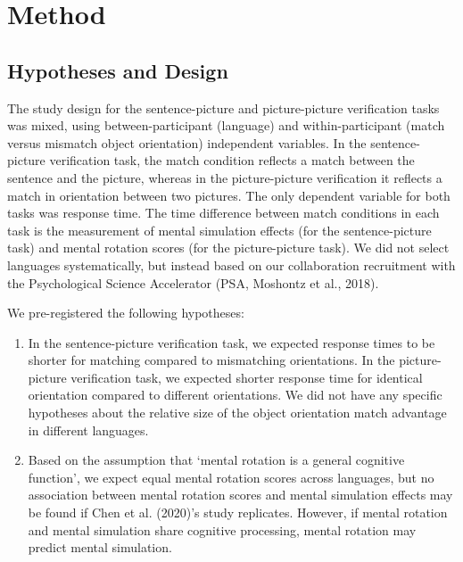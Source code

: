 \documentclass[
  man,mask,floatsintext]{apa7}
\begin{document}
\hypertarget{method}{%
\section{Method}\label{method}}

\hypertarget{hypotheses-and-design}{%
\subsection{Hypotheses and Design}\label{hypotheses-and-design}}

The study design for the sentence-picture and picture-picture
verification tasks was mixed, using between-participant (language) and
within-participant (match versus mismatch object orientation)
independent variables. In the sentence-picture verification task, the
match condition reflects a match between the sentence and the picture,
whereas in the picture-picture verification it reflects a match in
orientation between two pictures. The only dependent variable for both
tasks was response time. The time difference between match conditions in
each task is the measurement of mental simulation effects (for the
sentence-picture task) and mental rotation scores (for the
picture-picture task). We did not select languages systematically, but
instead based on our collaboration recruitment with the Psychological
Science Accelerator (PSA, Moshontz et al., 2018).

We pre-registered the following hypotheses:

\begin{enumerate}
\def\labelenumi{(\arabic{enumi})}
\item
  In the sentence-picture verification task, we expected response
  times to be shorter for matching compared to mismatching
  orientations. In the picture-picture verification task, we expected
  shorter response time for identical orientation compared to
  different orientations. We did not have any specific hypotheses
  about the relative size of the object orientation match advantage in
  different languages.
\item
  Based on the assumption that `mental rotation is a general cognitive
  function', we expect equal mental rotation scores across languages,
  but no association between mental rotation scores and mental
  simulation effects may be found if Chen et al. (2020)'s study
  replicates. However, if mental rotation and mental simulation share
  cognitive processing, mental rotation may predict mental simulation.
\end{enumerate}
\end{document}
